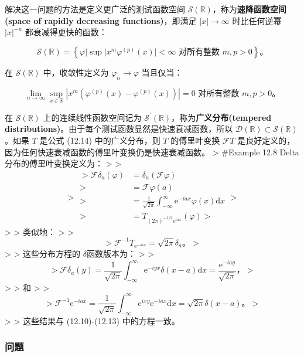 解决这一问题的方法是定义更广泛的测试函数空间
$\mathcal{S}(\mathbb{R})$，称为\textbf{速降函数空间(space of rapidly decreasing functions)}，即满足
$|x| \to \infty$ 时比任何逆幂 $|x|^{-n}$ 都衰减得更快的函数：

$$
\mathcal{S}(\mathbb{R}) = \left\{\varphi | \sup |x^m \varphi^{(p)}(x)| < \infty \text{ 对所有整数 } m, p > 0 \right\}。
$$

在 $\mathcal{S}(\mathbb{R})$ 中，收敛性定义为
$\varphi_n \to \varphi$ 当且仅当：

$$
\lim_{n \to \infty} \sup_{x \in \mathbb{R}} \left|x^m \left(\varphi^{(p)}(x) - \varphi^{(p)}(x)\right)\right| = 0 \text{ 对所有整数 } m, p > 0。
$$

在 $\mathcal{S}(\mathbb{R})$ 上的连续线性函数空间记为
$\mathcal{S}^\prime(\mathbb{R})$，称为\textbf{广义分布(tempered distributions)}。由于每个测试函数显然是快速衰减函数，所以
$\mathcal{D}(\mathbb{R}) \subset \mathcal{S}(\mathbb{R})$。如果 $T$
是公式 (12.14) 中的广义分布，则 $T$ 的傅里叶变换 $\mathcal{F} T$
是良好定义的，因为任何快速衰减函数的傅里叶变换仍是快速衰减函数。
\textgreater{} \#Example 12.8 Delta分布的傅里叶变换定义为：
\textgreater{} \textgreater{} $$
> \begin{aligned}
> \mathcal{F} \delta_{a}(\varphi) & = \delta_{a}(\mathcal{F} \varphi) \\
> & = \mathcal{F} \varphi(a) \\
> & = \frac{1}{\sqrt{2 \pi}} \int_{-\infty}^\infty \mathrm{e}^{-i a x} \varphi(x) \mathrm{d} x \\
> & = T_{(2 \pi)^{-1 / 2} \mathrm{e}^{i a x}}(\varphi)
> \end{aligned}
> $$ \textgreater{} \textgreater{} 类似地： \textgreater{}
\textgreater{} $$
> \mathcal{F}^{-1} T_{\mathrm{e}^{-i a x}} = \sqrt{2 \pi} \delta_{a}。
> $$ \textgreater{} \textgreater{} 这些分布方程的 $\delta$函数版本为：
\textgreater{} \textgreater{} $$
> \mathcal{F} \delta_{a}(y) = \frac{1}{\sqrt{2 \pi}} \int_{-\infty}^\infty \mathrm{e}^{-i y x} \delta(x-a) \mathrm{d} x = \frac{\mathrm{e}^{-i a y}}{\sqrt{2 \pi}}，
> $$ \textgreater{} \textgreater{} 和 \textgreater{} \textgreater{} $$
> \mathcal{F}^{-1} \mathrm{e}^{-i a x} = \frac{1}{\sqrt{2 \pi}} \int_{-\infty}^\infty \mathrm{e}^{i x y} \mathrm{e}^{-i a x} \mathrm{d} x = \sqrt{2 \pi} \delta(x-a)。
> $$ \textgreater{} \textgreater{} 这些结果与 (12.10)-(12.13)
中的方程一致。

\subsubsection{问题}\label{ux95eeux9898-2}

